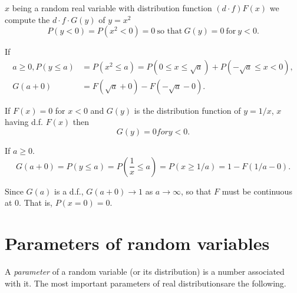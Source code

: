 \setcounter{example}{0}
\begin{example}\label{chap2:sec2:exp1}%
$x$ being a random real variable with distribution function $(d\cdot
  f) F(x)$   we compute the $d\cdot f\cdot G(y)$ of $y = x^2$ 
  $$
  P(y<0) = P(x^2< 0) = 0 ~\text{so that}~ G(y) =0 ~\text{for}~ y < 0.
  $$
\end{example}

If 
\begin{align*} 
  a \geq 0, P(y \leq a) & = P(x^2 \leq a) =P(0 \leq x \leq \sqrt{a})
  +P(-\sqrt{a}\leq x < 0),\\ 
  G(a+0) & =F(\sqrt{a}+0) -F(-\sqrt{a}-0).
\end{align*}

\begin{example}\label{chap2:sec2:exp2} %
  If $F(x) =0$ for $x < 0$ and $G(y)$ is the
  distribution function of $y=1/x$, $x$ having d.f. $F(x)$ then 
  $$
  G(y) =0 for y < 0.
  $$
  
  If $a \geq 0$.
  $$
  G(a+0) =P(y \leq a) =P\left(\frac{1}{x} \leq a\right) =P(x \geq 1/a) =1 -F(1/a
  -0).
  $$
  
  Since $G(a)$ is a d.f., $G(a+0) \rightarrow 1$ as $a \rightarrow
  \infty$, so that $F$ must be continuous at 0. That is, $P(x=0) =0$. 
\end{example}

\section{Parameters of random variables}\label{chap2:sec3}

A \textit{parameter} of a random variable (or its distribution) is a number
associated with it. The most important parameters of real 
distributions\pageoriginale are the following.

